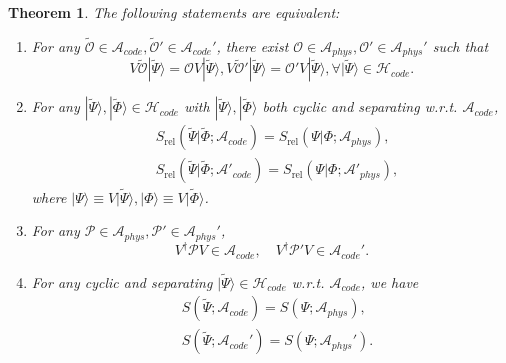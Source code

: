 \documentclass[a4paper,11pt]{article}
\newtheorem{thm}{Theorem}[section]
\newcommand{\ket}[1]{| #1 \rangle } %
\renewcommand{\=}[1]{\stackrel{#1}{=}} %
\def\A{\mathcal{A}}
\def\O{\mathcal{O}}
\def\P{\mathcal{P}}
\def\H{\mathcal{H}}
\def\Srel{S_{\text{rel}}}
\begin{document}
\begin{thm}\label{thm:alg}
	The following statements are equivalent: 
	\begin{enumerate}
		\item For any $\widetilde{\O}\in\A_{code},\widetilde{\O}'\in\A_{code}'$, there exist $\O\in \A_{phys},\O'\in \A_{phys}'$ such that
		\begin{equation}
			V\widetilde{\O}\ket{\widetilde{\Psi}}=\O V\ket{\widetilde{\Psi}}, V\widetilde{\O}'\ket{\widetilde{\Psi}}=\O' V\ket{\widetilde{\Psi}},\forall \ket{\widetilde{\Psi}}\in\H_{code}.
		\end{equation}
		
		\item For any $\ket{\widetilde{\Psi}},\ket{\widetilde{\Phi}}\in\H_{code}$ with $\ket{\widetilde{\Psi}},\ket{\widetilde{\Phi}}$ both cyclic and separating w.r.t. $\A_{code}$, 
		\begin{equation}\label{eq:JLMS}
			\begin{aligned}
				&\Srel(\widetilde{\Psi}|\widetilde{\Phi};\A_{code})=\Srel(\Psi|\Phi;\A_{phys}),\\&\Srel(\widetilde{\Psi}|\widetilde{\Phi};\A'_{code})=\Srel(\Psi|\Phi;\A'_{phys}),
			\end{aligned}
		\end{equation}
		where $\ket{\Psi}\equiv V\ket{\widetilde{\Psi}},\ket{\Phi}\equiv V\ket{\widetilde{\Phi}}$.
		
		\item For any $\P \in\A_{phys},\P '\in\A_{phys}'$,
		\begin{equation}
			V^\dagger \P V\in\A_{code},\quad V^\dagger \P 'V\in\A_{code}'.
		\end{equation}
		
		
		
		\item 
		
		
		For any cyclic and separating $\ket{\widetilde{\Psi}}\in\H_{code}$  w.r.t. $\A_{code}$, we have
		\begin{equation}\label{eq:statement 4}
			\begin{aligned}
				&S(\widetilde{\Psi};\A_{code})=S(\Psi;\A_{phys}),\\ &S(\widetilde{\Psi};\A_{code}')=S(\Psi;\A_{phys}').
			\end{aligned}
		\end{equation}
	\end{enumerate}
\end{thm}
\end{document}
